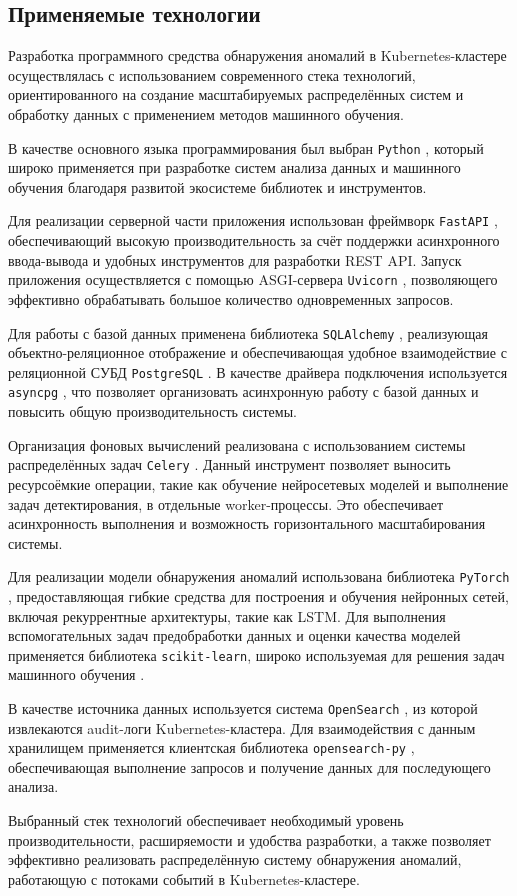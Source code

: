\subsection{Применяемые технологии}

Разработка программного средства обнаружения аномалий в Kubernetes-кластере осуществлялась с использованием современного стека технологий, ориентированного на создание масштабируемых распределённых систем и обработку данных с применением методов машинного обучения.

В качестве основного языка программирования был выбран \texttt{Python} \cite{Python}, который широко применяется при разработке систем анализа данных и машинного обучения благодаря развитой экосистеме библиотек и инструментов.

Для реализации серверной части приложения использован фреймворк \texttt{FastAPI} \cite{FastAPI}, обеспечивающий высокую производительность за счёт поддержки асинхронного ввода-вывода и удобных инструментов для разработки REST API. Запуск приложения осуществляется с помощью ASGI-сервера \texttt{Uvicorn} \cite{Uvicorn}, позволяющего эффективно обрабатывать большое количество одновременных запросов.

Для работы с базой данных применена библиотека \texttt{SQLAlchemy} \cite{SQLAlchemy}, реализующая объектно-реляционное отображение и обеспечивающая удобное взаимодействие с реляционной СУБД \texttt{PostgreSQL} \cite{PostgreSQL}. В качестве драйвера подключения используется \texttt{asyncpg} \cite{asyncpg}, что позволяет организовать асинхронную работу с базой данных и повысить общую производительность системы.

Организация фоновых вычислений реализована с использованием системы распределённых задач \texttt{Celery} \cite{Celery}. Данный инструмент позволяет выносить ресурсоёмкие операции, такие как обучение нейросетевых моделей и выполнение задач детектирования, в отдельные worker-процессы. Это обеспечивает асинхронность выполнения и возможность горизонтального масштабирования системы.

Для реализации модели обнаружения аномалий использована библиотека \texttt{PyTorch} \cite{PyTorch}, предоставляющая гибкие средства для построения и обучения нейронных сетей, включая рекуррентные архитектуры, такие как LSTM. Для выполнения вспомогательных задач предобработки данных и оценки качества моделей применяется библиотека \texttt{scikit-learn}, широко используемая для решения задач машинного обучения \cite{ScikitLearn}.

В качестве источника данных используется система \texttt{OpenSearch} \cite{OpenSearch}, из которой извлекаются audit-логи Kubernetes-кластера. Для взаимодействия с данным хранилищем применяется клиентская библиотека \texttt{opensearch-py} \cite{OpenSearchPy}, обеспечивающая выполнение запросов и получение данных для последующего анализа.

Выбранный стек технологий обеспечивает необходимый уровень производительности, расширяемости и удобства разработки, а также позволяет эффективно реализовать распределённую систему обнаружения аномалий, работающую с потоками событий в Kubernetes-кластере.